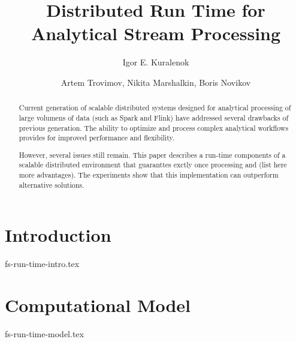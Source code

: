 \documentclass[sigconf]{acmart}
\begin{document}
\title {Distributed Run Time for Analytical Stream Processing}


\author{Igor E. Kuralenok}

\author{Artem Trovimov, Nikita Marshalkin, Boris Novikov}


\begin{abstract}
Current generation of scalable distributed systems designed for analytical processing of large volumens of data (such as  Spark and Flink) have addressed several drawbacks of previous generation. The ability to optimize and process complex analytical workflows  provides for improved performance and flexibility.

However, several issues still remain. This paper describes a run-time components of a scalable distributed environment that guaranttes exctly once  processing and (list here more advantages). The experiments show that this implementation can outperform alternative solutions.
\end {abstract}

\maketitle


\section {Introduction}
 {fs-run-time-intro.tex}

\section {Computational Model}
 {fs-run-time-model.tex}
\end{document}
